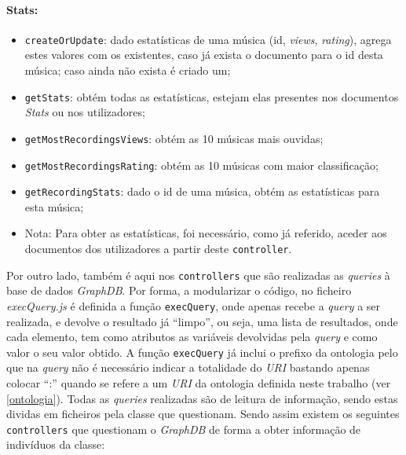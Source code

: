 \documentclass{article}
\begin{document}
\paragraph{\textbf{Stats:}}
    \begin{itemize}
        \item \texttt{createOrUpdate}: dado estatísticas de uma música (id, \textit{views}, \textit{rating}), agrega estes valores com os existentes, caso já exista o documento para o id desta música; caso ainda não exista é criado um;
        \item \texttt{getStats}: obtém todas as estatísticas, estejam elas presentes nos documentos \textit{Stats} ou nos utilizadores;
        \item \texttt{getMostRecordingsViews}: obtém as 10 músicas mais ouvidas;
        \item \texttt{getMostRecordingsRating}: obtém as 10 músicas com maior classificação;
        \item \texttt{getRecordingStats}: dado o id de uma música, obtém as estatísticas para esta música;
        \item Nota: Para obter as estatísticas, foi necessário, como já referido, aceder aos documentos dos utilizadores a partir deste \texttt{controller}.
    \end{itemize}

Por outro lado, também é aqui nos \texttt{controllers} que são realizadas as \textit{queries} à base de dados \textit{GraphDB}. Por forma, a modularizar o código, no ficheiro \textit{execQuery.js} é definida a função \texttt{execQuery}, onde apenas recebe a \textit{query} a ser realizada, e devolve o resultado já ``limpo'', ou seja, uma lista de resultados, onde cada elemento, tem como atributos as variáveis devolvidas pela \textit{query} e como valor o seu valor obtido. A função \texttt{execQuery} já inclui o prefixo da ontologia pelo que na \textit{query} não é necessário indicar a totalidade do \textit{URI} bastando apenas colocar ``:'' quando se refere a um \textit{URI} da ontologia definida neste trabalho (ver \ref{ontologia}). Todas as \textit{queries} realizadas são de leitura de informação, sendo estas dividas em ficheiros pela classe que questionam. Sendo assim existem os seguintes \texttt{controllers} que questionam o \textit{GraphDB} de forma a obter informação de indivíduos da classe:
\end{document}
